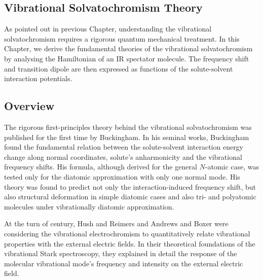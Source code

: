 \documentclass[b5paper,oneside,fleqn,11pt]{book}
\begin{document}
\begin{refsection}
\chapter{Vibrational Solvatochromism Theory\label{c:background}}

As pointed out in previous Chapter, understanding the vibrational
solvatochromism requires a rigorous quantum mechanical treatment.
In this Chapter, we derive the fundamental theories of the vibrational
solvatochromism by analysing the Hamiltonian of an IR spectator molecule.
The frequency shift and transition dipole are then expressed as functions
of the solute\hyp{}solvent interaction potentials.

\section{Overview\label{s:theory}}

The rigorous first\hyp{}principles theory behind the vibrational solvatochromism was published
for the first time by Buckingham. \citep{Buckingham.ProcRSocLondonA.1958,
Buckingham.TransFaradaySoc.1960,Buckingham.ProcRSocLondonA.1960} 
In his seminal works, Buckingham found the fundamental 
relation between the solute\hyp{}solvent interaction energy change along normal 
coordinates, solute's anharmonicity and the vibrational frequency shifts.
His formula, although derived for the general $N$-atomic case, was tested
only for the diatomic approximation with only one normal mode. 
His theory was found to predict not only
the interaction\hyp{}induced frequency shift, but also structural deformation in simple
diatomic cases \citep{McDowell.Buckingham.MolPhys.2005,McDowell.Buckingham.JACS.2005,
McDowell.Buckingham.SpectrChimActaA.2005,Buckingham.CPL.2008} 
and also tri- and polyatomic molecules under 
vibrationally diatomic approximation. \citep{McDowell.Buckingham.SpectrChimActaA.2005,
Buckingham.CPL.2008,Herrebout.Delanoye.vanderVeken.JPCA.2004}

At the turn of  century, Hush and Reimers \citep{Hush.Reimers.JPC.1995,Reimers.Zeng.Hush.JPC.1996} 
and Andrews and Boxer \citep{Andrews.Boxer.JPCA.2002,Andrews.Boxer.JPCA.2000} 
were considering the vibrational electrochromism
to quantitatively relate vibrational properties with the external electric fields.
In their theoretical foundations of the vibrational Stark spectroscopy,
they explained in detail the response of the molecular vibrational mode's frequency
and intensity
on the external electric field. 


\end{refsection}
\end{document}

